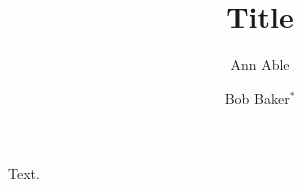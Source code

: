 \documentclass[sigconf]{acmart}
\begin{document}
\title{Title}
\author{Ann Able}
\author{Bob Baker$^{*}$}
\authornotemark[1]
\maketitle
Text.
\end{document}
